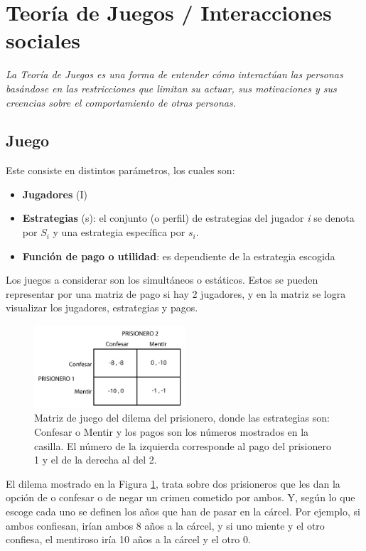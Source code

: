 \section{Teoría de Juegos / Interacciones sociales}
\newline
\newline
\textit{La Teoría de Juegos es una forma de entender cómo interactúan las personas basándose en las restricciones que limitan su actuar, sus motivaciones y sus creencias sobre el comportamiento de otras personas.}
\subsection{Juego}

Este consiste en distintos parámetros, los cuales son:
\begin{itemize}
    \item \textbf{Jugadores} (I)
    \item \textbf{Estrategias} (s): el conjunto (o perfil) de estrategias del jugador \textit{i} se denota por $S_i$ y una estrategia específica por $s_i$.
    \item \textbf{Función de pago o utilidad}: es dependiente de la estrategia escogida
\end{itemize}

Los juegos a considerar son los simultáneos o estáticos. Estos se pueden representar por una matriz de pago si hay 2 jugadores, y en la matriz se logra visualizar los jugadores, estrategias y pagos.

\begin{figure}[H]
    \centering
    \includegraphics[width=0.5\textwidth]{Modulo_3/Dilema-del-prisionero.jpg}
    \caption{Matriz de juego del dilema del prisionero, donde las estrategias son: Confesar o Mentir y los pagos son los números mostrados en la casilla. El número de la izquierda corresponde al pago del prisionero 1 y el de la derecha al del 2.}
    \label{img:matriz-dilema-prisionero}
\end{figure}


El dilema mostrado en la Figura \ref{img:matriz-dilema-prisionero}, trata sobre dos prisioneros que les dan la opción de o confesar o de negar un crimen cometido por ambos. Y, según lo que escoge cada uno se definen los años que han de pasar en la cárcel. Por ejemplo, si ambos confiesan, irían ambos 8 años a la cárcel, y si uno miente y el otro confiesa, el mentiroso iría 10 años a la cárcel y el otro 0.


